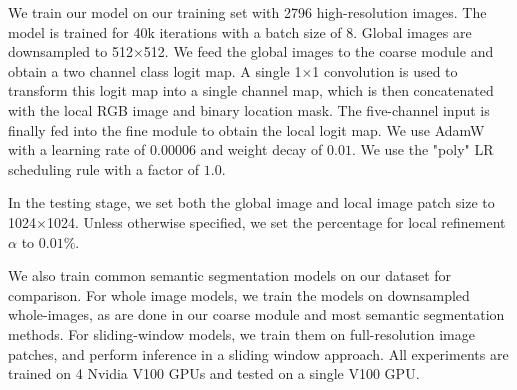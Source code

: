 We train our model on our training set with 2796 high-resolution images. The model is trained for 40k iterations with a batch size of 8. Global images are downsampled to 512$\times$512. We feed the global images to the coarse module and obtain a two channel class logit map. A single 1$\times$1 convolution is used to transform this logit map into a single channel map, which is then concatenated with the local RGB image and binary location mask. The five-channel input is finally fed into the fine module to obtain the local logit map. We use AdamW~\cite{adamw} with a learning rate of $0.00006$ and weight decay of $0.01$. We use the "poly" LR scheduling rule with a factor of $1.0$.

In the testing stage, we set both the global image and local image patch size to 1024$\times$1024. Unless otherwise specified, we set the percentage for local refinement $\alpha$ to $0.01\%$.

We also train common semantic segmentation models on our dataset for comparison. For whole image models, we train the models on downsampled whole-images, as are done in  our coarse module and most semantic segmentation methods. For sliding-window models, we train them on full-resolution image patches, and perform inference in a sliding window approach. All experiments are trained on 4 Nvidia V100 GPUs and tested on a single V100 GPU.


